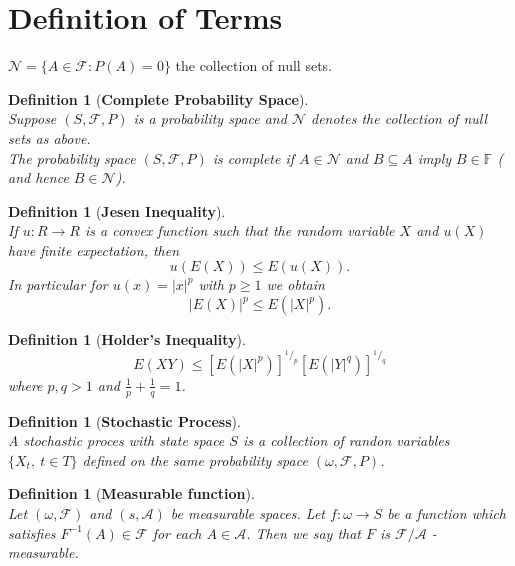 \documentclass[a4 paper, 12pt]{report}
\newcommand*\rfrac[2]{{}^{#1}\!/_{#2}}
\theoremstyle{plain}
\newtheorem{definition}[theorem]{\textbf{Definition}}
\begin{document}
\section{Definition of Terms}
$\mathcal{N} = \{A\in \mathcal{F}: P(A) = 0\}$ the collection of null sets.
\begin{definition}[\textbf{Complete Probability Space}]\label{1.2.1}
\normalfont
~~ \\Suppose $(S,\mathcal{F},P)$ is a probability space and $\mathcal{N}$ denotes the collection of null sets as above.\\
The probability space $(S,\mathcal{F},P)$ is complete if $A\in\mathcal{N}$ and $B\subseteq A$ imply $B\in\mathbb{F}$ ( and hence $B\in\mathcal{N}$).
\end{definition}

\begin{definition}[\textbf{Jesen Inequality}]\label{1.2.2}
\normalfont
~~\\
If $u:R\rightarrow R$ is a convex function such that the random variable $X$ and $u(X)$ have finite expectation, then
$$u(E(X))\leq E(u(X)).$$
In particular for $u(x) = |x|^p$ with $p\geq 1$ we obtain
$$
|E(X)|^p\leq E(|X|^p).
$$
\end{definition}


\begin{definition}[\textbf{Holder's Inequality}]\label{1.2.3}
\normalfont
$$
E(XY)\leq [E(|X|^p)]^{\rfrac{1}{p}}[E(|Y|^q)]^{\rfrac{1}{q}}
$$
where $p,q>1$ and $\frac{1}{p}+ \frac{1}{q} = 1$.
\end{definition}


\begin{definition}[\textbf{Stochastic Process}]\label{1.2.4}
\normalfont
~~\\A stochastic proces with state space $S$ is a collection of randon variables $\{X_t,~t\in T\}$ defined on the same probability space $(\omega,\mathcal{F},P)$.
\end{definition}


\begin{definition}[\textbf{Measurable function}]\label{1.2.5}
\normalfont
~~\\
Let $(\omega, \mathcal{F})$ and $(s,\mathcal{A})$ be measurable spaces. Let $f:\omega\rightarrow S$ be a function which satisfies $F^{-1}(A)\in\mathcal{F}$ for each $A\in\mathcal{A}$. Then we say that $F$ is $\mathcal{F}/\mathcal{A}$ - measurable.
\end{definition}
\end{document}

